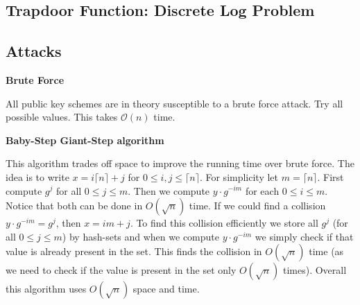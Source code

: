 \documentclass{article}
\begin{document}
\subsection*{Trapdoor Function: Discrete Log Problem}



\subsection*{Attacks}

\begin{center}
    \textbf{Brute Force}
\end{center}

All public key schemes are in theory susceptible to a brute force attack. Try all possible values. This takes $\mathcal{O}(n)$ time.

\begin{center}
    \textbf{Baby-Step Giant-Step algorithm}
\end{center}

This algorithm trades off space to improve the running time over brute force. The idea is to write $x = i\lceil n \rceil + j$ for $0 \le i,j \le \lceil n \rceil$. For simplicity let $m = \lceil n \rceil$. First compute $g^j$ for all $0 \le j \le m$. Then we compute $y\cdot g^{-im}$ for each $0 \le i \le m$. Notice that both can be done in $O(\sqrt n )$ time. If we could find a collision $y\cdot g^{-im} = g^j$, then $x = im + j$. To find this collision efficiently we store all $g^j$ (for all $0 \le j \le m$) by hash-sets and when we compute $y\cdot g^{-im}$ we simply check if that value is already present in the set. This finds the collision in $O(\sqrt{n})$ time (as we need to check if the value is present in the set only $O(\sqrt{n})$ times). Overall this algorithm uses $O(\sqrt{n})$ space and time.




\end{document}
